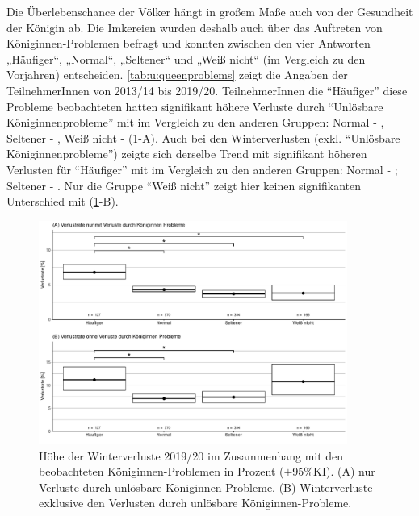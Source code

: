 Die Überlebenschance der Völker hängt in großem Maße auch von der Gesundheit der Königin ab. Die Imkereien wurden deshalb auch über das Auftreten von Königinnen-Problemen befragt und konnten zwischen den vier Antworten „Häufiger``, „Normal``, „Seltener`` und „Weiß nicht`` (im Vergleich zu den Vorjahren) entscheiden. \cref{tab:u:queenproblems} zeigt die Angaben der TeilnehmerInnen von 2013/14 bis 2019/20.
\newline
TeilnehmerInnen die \enquote{Häufiger} diese Probleme beobachteten hatten signifikant höhere Verluste durch \enquote{Unlösbare Königinnenprobleme} mit  im Vergleich zu den anderen Gruppen: Normal - , Seltener - , Weiß nicht -  (\cref{fig:u:queen:problems}-A). Auch bei den Winterverlusten (exkl. \enquote{Unlösbare Königinnenprobleme}) zeigte sich derselbe Trend mit signifikant höheren Verlusten für \enquote{Häufiger} mit  im Vergleich zu den anderen Gruppen: Normal - ; Seltener - . Nur die Gruppe \enquote{Weiß nicht} zeigt hier keinen signifikanten Unterschied mit  (\cref{fig:u:queen:problems}-B).



\begin{figure}[H]
  \centering
  \includegraphics[keepaspectratio,width=0.9\textwidth]{project-U-wintersterblichkeit/figures/plot_queen_subjectiveproblems}
  \caption{Höhe der Winterverluste 2019/20 im Zusammenhang mit den beobachteten Königinnen-Problemen in Prozent ($\pm$95\%KI). (A) nur Verluste durch unlösbare Königinnen Probleme. (B) Winterverluste exklusive den Verlusten durch unlösbare Königinnen-Probleme.}
  \label{fig:u:queen:problems}
\end{figure}


